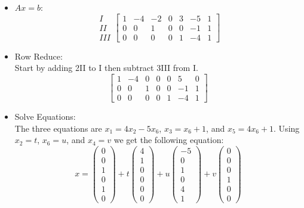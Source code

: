 \documentclass[12pt,a4paper]{exam}
\begin{document}
\begin{enumerate}
\begin{solution}
    \begin{itemize}
        \item $Ax=b$:\\
            \[ \begin{matrix}
                I\\II\\III
            \end{matrix} \left[ \begin{array}{ccccccc}
            1 & -4 & -2 & 0 & 3 & -5 & 1\\
            0 & 0 & 1 & 0 & 0 & -1 & 1\\ 
            0 & 0 & 0 & 0 & 1 & -4 & 1
            \end{array} \right] \]
        \item Row Reduce:\\
            Start by adding 2II to I then subtract 3III from I.
            \[ \left[ \begin{array}{ccccccc}
            1 & -4 & 0 & 0 & 0 & 5 & 0\\
            0 & 0 & 1 & 0 & 0 & -1 & 1\\ 
            0 & 0 & 0 & 0 & 1 & -4 & 1
            \end{array} \right] \]
        \item Solve Equations:\\
            The three equations are $x_1=4x_2-5x_6$, $x_3=x_6+1$, and $x_5=4x_6+1$. Using $x_2=t$, $x_6=u$, and $x_4=v$ we get the following equation:
            $$x=\left(\begin{matrix}
                0\\0\\1\\0\\1\\0
            \end{matrix} \right) + 
            t\left(\begin{matrix}
                4\\1\\0\\0\\0\\0
            \end{matrix} \right) + 
            u\left(\begin{matrix}
                -5\\0\\1\\0\\4\\1
            \end{matrix} \right) + 
            v\left(\begin{matrix}
                0\\0\\0\\1\\0\\0
            \end{matrix} \right)$$


\end{itemize}
\end{solution}
\end{enumerate}
\end{document}
